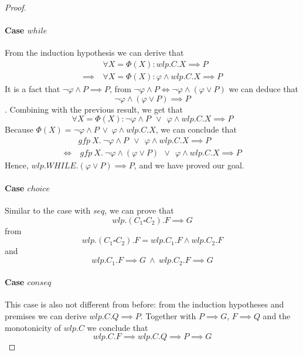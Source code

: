 \begin{proof}
	\paragraph{Case $while$}
	From the induction hypothesis we can derive that 
	\begin{align*}
		&\forall X=\Phi(X):  wlp.C.X\implies P \\
		\implies\ & \forall X=\Phi(X): \varphi\wedge wlp.C.X\implies P 
	\end{align*}
	It is a fact that $\neg\varphi\wedge P \implies P$, from $\neg\varphi\wedge P \iff \neg\varphi\wedge (\varphi\vee P)$ we can deduce that $$\neg\varphi\wedge (\varphi\vee P) \implies P$$. 
	Combining with the previous result, we get that 
	$$\forall X=\Phi(X):  \neg\varphi\wedge P  \ \ \vee \ \ \varphi \wedge wlp.C.X\implies P$$
	Because 
	$\Phi(X) = \neg\varphi\wedge P \ \vee\  \varphi\wedge wlp.C.X$, we can conclude that 
	\begin{align*}
		& gfp \ X. \  \neg\varphi\wedge P  \ \ \vee \ \ \varphi \wedge wlp.C.X\implies P\\
		\iff &\ gfp \ X. \  \neg\varphi\wedge (\varphi\vee P)  \ \ \vee \ \ \varphi \wedge wlp.C.X\implies P
	\end{align*}
	Hence, 
	$wlp.WHILE.(\varphi\vee P)\implies P$, and we have proved our goal.

	\paragraph{Case $choice$} Similar to the case with $seq$, we can prove that $$wlp.(C_1\square C_2).F \implies G$$ from 
	$$wlp.(C_1\square C_2).F = wlp.C_1.F \wedge wlp.C_2.F$$
	and 
	$$wlp.C_1.F \implies G\ \wedge\ wlp.C_2.F \implies G$$

	\paragraph{Case $conseq$}
	This case is also not different from before: from the induction hypotheses and premises we can derive $wlp.C.Q \implies P$. 
	Together with $P\implies G$, $F\implies Q$ and the monotonicity of $wlp.C$ we conclude that 
	$$wlp.C.F\implies wlp.C.Q \implies P \implies G$$
\end{proof}




